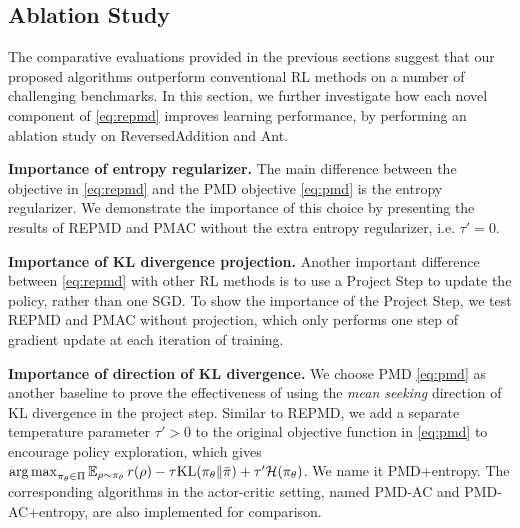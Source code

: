 
\subsection{Ablation Study}
\label{subsec:ablationstudy}

The comparative evaluations provided in the previous sections suggest 
that our proposed algorithms 
outperform conventional RL methods on a number of challenging benchmarks.
In this section, we further investigate how each novel component of
\cref{eq:repmd} improves learning performance,
by performing an ablation study on ReversedAddition and Ant.


\textbf{Importance of entropy regularizer.}
The main difference between the objective in \cref{eq:repmd} and the PMD
objective \cref{eq:pmd} is the entropy regularizer.
We demonstrate the importance of this choice by presenting the results of REPMD and PMAC without the extra entropy regularizer, i.e. $\tau'=0$.

\textbf{Importance of KL divergence projection.}
Another important difference between \cref{eq:repmd} with other RL methods
is to use a Project Step to update the policy,
rather than one SGD.
To show the importance of the Project Step,
we test REPMD and PMAC without projection,
which only performs one step of gradient update at each iteration of training. 

\textbf{Importance of direction of KL divergence.}
We choose PMD \cref{eq:pmd} as another baseline
to prove the effectiveness of using the \emph{mean seeking}
direction of KL divergence in the project step.
Similar to REPMD, we add a separate temperature parameter $\tau' > 0$
to the original objective function in \cref{eq:pmd}
to encourage policy exploration,
which gives
$\operatorname*{arg\,max}_{\pi_\theta \in \Pi}{ \operatorname*{\mathbb{E}}_{\rho \sim \pi_\theta}{  r(\rho)  - \tau \text{KL}(\pi_\theta \| \bar{\pi}) } + \tau'\mathcal{H}(\pi_\theta) }$.
We name it PMD+entropy.
The corresponding algorithms in the actor-critic setting,
named PMD-AC and PMD-AC+entropy, are also implemented for comparison.

